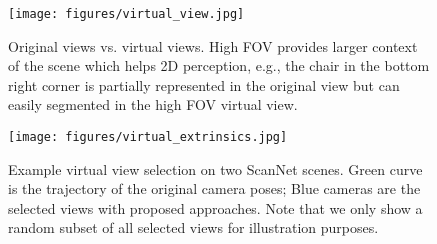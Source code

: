\documentclass[runningheads]{llncs}
\begin{document}
\begin{figure}[t]
    \centering
    \texttt{[image: figures/virtual\_view.jpg]}
    \caption{Original views vs. virtual views. High FOV provides larger context of the scene which helps 2D perception, e.g., the chair in the bottom right corner is partially represented in the original view but can easily segmented in the high FOV virtual view.}
    \label{fig:virtual_view}
\end{figure}

\begin{figure}[t]
    \centering
    \texttt{[image: figures/virtual\_extrinsics.jpg]}
    \caption{Example virtual view selection on two ScanNet scenes. Green curve is the trajectory of the original camera poses; Blue cameras are the selected views with proposed approaches. Note that we only show a random subset of all selected views for illustration purposes.}
    \label{fig:virtual_extrinsics}
\end{figure}
\end{document}
